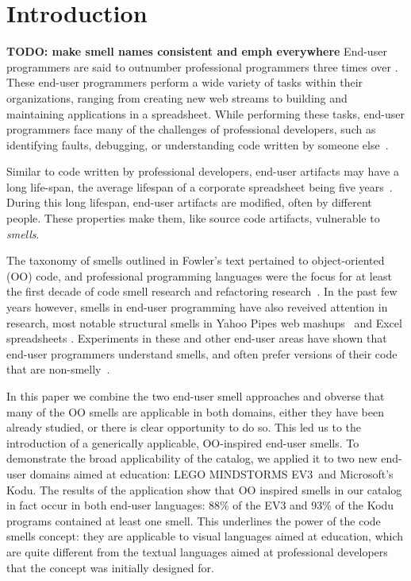 \documentclass{sig-alternate}
\newcommand{\todo}[1]{\textbf{TODO: #1}}
\newcommand{\ms}{LEGO MINDSTORMS EV3}
\begin{document}
\section{Introduction}
\todo{make smell names consistent and emph everywhere}
End-user programmers are said to outnumber  professional programmers three times over \cite{Scaf2005}.
These end-user programmers perform a wide variety of tasks within their organizations, ranging from creating new web streams to building and maintaining applications in a spreadsheet. While performing these tasks, end-user programmers face many of the challenges of professional developers, such as identifying faults, debugging, or understanding code written by someone else~\cite{Ko2011}.

Similar to code written by professional developers, end-user artifacts may have a long life-span, the average lifespan of a corporate spreadsheet being five years~\cite{Hermans2011}. During this long lifespan, end-user artifacts are modified, often by different people.
These properties make them, like source code artifacts, vulnerable to \emph{smells}. 

The taxonomy of smells outlined in Fowler's text pertained to object-oriented (OO) code, and professional programming languages were the focus for at least the first decade of code smell research and refactoring research~\cite{Mens:2004:SSR:972215.972286}. In the past few years however, smells in end-user programming have also reveived attention in research, most notable structural smells in Yahoo Pipes web mashups~\cite{Stolee2011} and Excel spreadsheets \cite{Hermans2012inter}. Experiments in these and other end-user areas have shown that end-user programmers understand smells, and often prefer versions of their code that are non-smelly~\cite{Hermans2012intra, StoleeTSE2013, chambers2013smell}.


In this paper we combine the two end-user smell approaches and obverse that many of the OO smells are applicable in both domains, either they have been already studied, or there is clear opportunity to do so. This led us to the introduction of a generically applicable, OO-inspired end-user smells. To demonstrate the broad applicability of the catalog, we applied it to two new end-user domains aimed at education: \ms~and Microsoft's Kodu. The results of the application show that OO inspired smells in our catalog in fact occur in both end-user languages: 88\% of the EV3 and 93\% of the Kodu programs contained at least one smell. This underlines the power of the code smells concept: they are applicable to visual languages aimed at education, which are quite different from the textual languages aimed at professional developers that the concept was initially designed for. 
\end{document}
